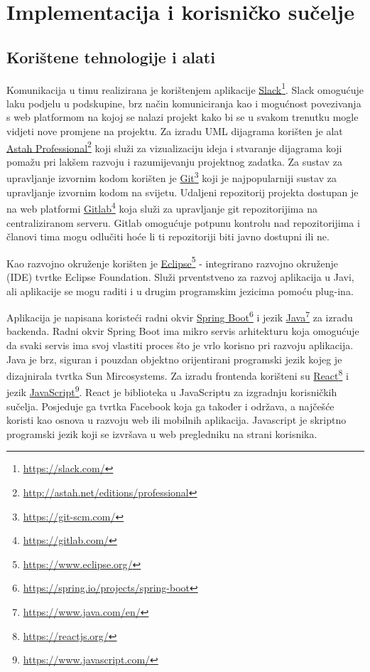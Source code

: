\chapter{Implementacija i korisničko sučelje}
		
		
		\section{Korištene tehnologije i alati}
		
%			
			
			Komunikacija u timu realizirana je korištenjem aplikacije \underline{Slack}\footnote{\url{https://slack.com/}}. Slack omogućuje laku podjelu u podskupine, brz način komuniciranja kao i mogućnost povezivanja s web platformom na kojoj se nalazi projekt kako bi se u svakom trenutku mogle vidjeti nove promjene na projektu. Za izradu UML dijagrama korišten je alat \underline{Astah Professional}\footnote{\url{http://astah.net/editions/professional}} koji služi za vizualizaciju ideja i stvaranje dijagrama koji pomažu pri lakšem razvoju i razumijevanju projektnog zadatka. Za sustav za upravljanje izvornim kodom korišten je \underline{Git}\footnote{\url{https://git-scm.com/}} koji je najpopularniji sustav za upravljanje izvornim kodom na svijetu. Udaljeni repozitorij projekta dostupan je na web platformi \underline{Gitlab}\footnote{\url{https://gitlab.com/}} koja služi za upravljanje git repozitorijima na centraliziranom serveru. Gitlab omogućuje potpunu kontrolu nad repozitorijima i članovi tima mogu odlučiti hoće li ti repozitoriji biti javno dostupni ili ne.
			
			Kao razvojno okruženje korišten je \underline{Eclipse}\footnote{\url{https://www.eclipse.org/}} - integrirano razvojno okruženje (IDE) tvrtke Eclipse Foundation. Služi prventstveno za razvoj aplikacija u Javi, ali aplikacije se mogu raditi i u drugim programskim jezicima pomoću plug-ina.
			
			Aplikacija je napisana koristeći radni okvir \underline{Spring Boot}\footnote{\url{https://spring.io/projects/spring-boot}} i jezik \underline{Java}\footnote{\url{https://www.java.com/en/}} za izradu backenda. Radni okvir Spring Boot ima mikro servis arhitekturu koja omogućuje da svaki servis ima svoj vlastiti proces što je vrlo korisno pri razvoju aplikacija. Java je brz, siguran i pouzdan objektno orijentirani programski jezik kojeg je dizajnirala tvrtka Sun Mircosystems. Za izradu frontenda korišteni su \underline{React}\footnote{\url{https://reactjs.org/}} i jezik \underline{JavaScript}\footnote{\url{https://www.javascript.com/}}. React je biblioteka u JavaScriptu za izgradnju korisničkih sučelja. Posjeduje ga tvrtka Facebook koja ga također i održava, a najčešće koristi kao osnova u razvoju web ili mobilnih aplikacija. Javascript je skriptno programski jezik koji se izvršava u web pregledniku na strani korisnika.
			
